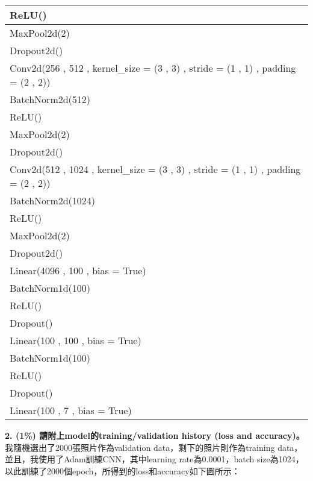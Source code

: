 \documentclass{article}
\begin{document}
\begin{center}
    \begin{tabular}{|l|}
        \hline
        ReLU()\\
        \hline
        MaxPool2d(2)\\
        \hline
        Dropout2d()\\
        \hline
        Conv2d(256 , 512 , kernel\_size = (3 , 3) , stride = (1 , 1) , padding = (2 , 2))\\
        \hline
        BatchNorm2d(512)\\
        \hline
        ReLU()\\
        \hline
        MaxPool2d(2)\\
        \hline
        Dropout2d()\\
        \hline
        Conv2d(512 , 1024 , kernel\_size = (3 , 3) , stride = (1 , 1) , padding = (2 , 2))\\
        \hline
        BatchNorm2d(1024)\\
        \hline
        ReLU()\\
        \hline
        MaxPool2d(2)\\
        \hline
        Dropout2d()\\
        \hline
        Linear(4096 , 100 , bias = True)\\
        \hline
        BatchNorm1d(100)\\
        \hline
        ReLU()\\
        \hline
        Dropout()\\
        \hline
        Linear(100 , 100 , bias = True)\\
        \hline
        BatchNorm1d(100)\\
        \hline
        ReLU()\\
        \hline
        Dropout()\\
        \hline
        Linear(100 , 7 , bias = True)\\
        \hline
    \end{tabular}
\end{center}

\bigskip

\noindent
{\bf 2. (1\%) 請附上model的training/validation history (loss and accuracy)。}\\

我隨機選出了2000張照片作為validation data，剩下的照片則作為training data，並且，我使用了Adam訓練CNN，其中learning rate為0.0001，batch size為1024，以此訓練了2000個epoch，所得到的loss和accuracy如下圖所示：
\end{document}
